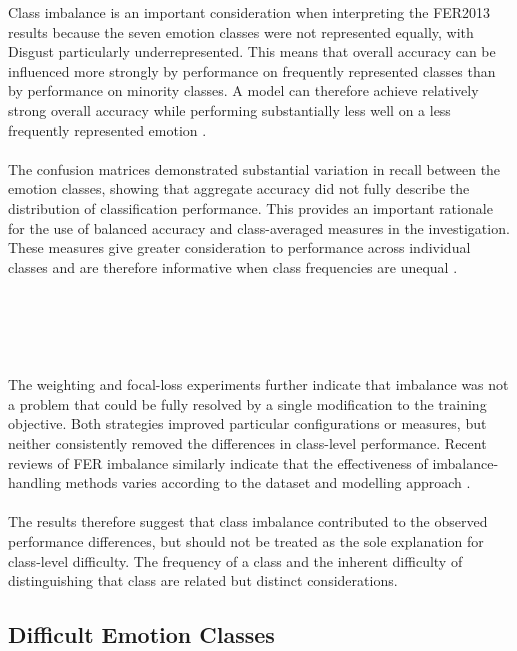\documentclass[12pt, a4paper]{report}
\let\oldsubsection\subsection
\renewcommand{\subsection}{%
    \Needspace{6\baselineskip}%
    \oldsubsection
}
\begin{document}
				Class imbalance is an important consideration when interpreting the FER2013 results because the seven emotion classes were not represented equally, with Disgust particularly underrepresented. This means that overall accuracy can be influenced more strongly by performance on frequently represented classes than by performance on minority classes. A model can therefore achieve relatively strong overall accuracy while performing substantially less well on a less frequently represented emotion \cite{Johnson2019ClassImbalance}.\\\\
				The confusion matrices demonstrated substantial variation in recall between the emotion classes, showing that aggregate accuracy did not fully describe the distribution of classification performance. This provides an important rationale for the use of balanced accuracy and class-averaged measures in the investigation. These measures give greater consideration to performance across individual classes and are therefore informative when class frequencies are unequal \cite{Farhadpour2024MetricsImbalance, Opitz2024ClassificationMetrics}.\\\\\\\\\\\\
				The weighting and focal-loss experiments further indicate that imbalance was not a problem that could be fully resolved by a single modification to the training objective. Both strategies improved particular configurations or measures, but neither consistently removed the differences in class-level performance. Recent reviews of FER imbalance similarly indicate that the effectiveness of imbalance-handling methods varies according to the dataset and modelling approach \cite{Hunafa2026FERImbalance}.\\\\
				The results therefore suggest that class imbalance contributed to the observed performance differences, but should not be treated as the sole explanation for class-level difficulty. The frequency of a class and the inherent difficulty of distinguishing that class are related but distinct considerations.
				
			\subsection{Difficult Emotion Classes}
				
\end{document}
